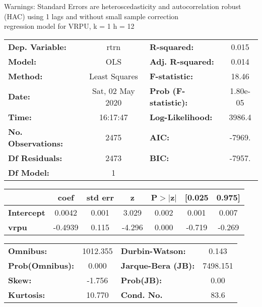 Warnings: \newline
 [1] Standard Errors are heteroscedasticity and autocorrelation robust (HAC) using 1 lags and without small sample correction\\ 

regression model for VRPU, k = 1 h = 12\begin{center}
\begin{tabular}{lclc}
\toprule
\textbf{Dep. Variable:}    &       rtrn       & \textbf{  R-squared:         } &     0.015   \\
\textbf{Model:}            &       OLS        & \textbf{  Adj. R-squared:    } &     0.014   \\
\textbf{Method:}           &  Least Squares   & \textbf{  F-statistic:       } &     18.46   \\
\textbf{Date:}             & Sat, 02 May 2020 & \textbf{  Prob (F-statistic):} &  1.80e-05   \\
\textbf{Time:}             &     16:17:47     & \textbf{  Log-Likelihood:    } &    3986.4   \\
\textbf{No. Observations:} &        2475      & \textbf{  AIC:               } &    -7969.   \\
\textbf{Df Residuals:}     &        2473      & \textbf{  BIC:               } &    -7957.   \\
\textbf{Df Model:}         &           1      & \textbf{                     } &             \\
\bottomrule
\end{tabular}
\begin{tabular}{lcccccc}
                   & \textbf{coef} & \textbf{std err} & \textbf{z} & \textbf{P$> |$z$|$} & \textbf{[0.025} & \textbf{0.975]}  \\
\midrule
\textbf{Intercept} &       0.0042  &        0.001     &     3.029  &         0.002        &        0.001    &        0.007     \\
\textbf{vrpu}      &      -0.4939  &        0.115     &    -4.296  &         0.000        &       -0.719    &       -0.269     \\
\bottomrule
\end{tabular}
\begin{tabular}{lclc}
\textbf{Omnibus:}       & 1012.355 & \textbf{  Durbin-Watson:     } &    0.143  \\
\textbf{Prob(Omnibus):} &   0.000  & \textbf{  Jarque-Bera (JB):  } & 7498.151  \\
\textbf{Skew:}          &  -1.756  & \textbf{  Prob(JB):          } &     0.00  \\
\textbf{Kurtosis:}      &  10.770  & \textbf{  Cond. No.          } &     83.6  \\
\bottomrule
\end{tabular}
\end{center}

